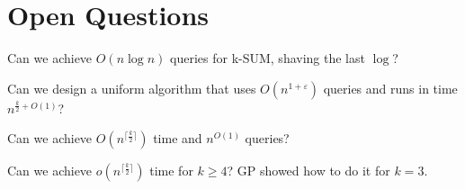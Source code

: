 \section{Open Questions}

Can we achieve \(O(n \log n)\) queries for k-SUM, shaving the last
\(\log{}\)?

Can we design a uniform algorithm that uses \(O(n^{1+ \varepsilon})\) queries and runs
in time \(n^{\frac{k}{2}+O(1)}\)?

Can we achieve \(O(n^{\lceil \frac k2 \rceil})\) time and \(n^{O(1)}\) queries?

Can we achieve \(o(n^{\lceil \frac k2 \rceil})\) time for \(k \geq 4\)? GP
showed how to do it for \(k = 3\).

